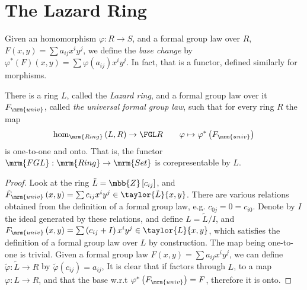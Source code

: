 \section{The Lazard Ring}

\begin{definition*}
	Given an homomorphism $\varphi: R \to S$,
	and a formal group law over $R$, $F\left(x,y\right) = \sum a_{ij} x^i y^j$,
	we define the \emph{base change} by
	$
		\varphi^*\left(F\right)\left(x,y\right)
		=
		\sum \varphi\left(a_{ij}\right) x^i y^j
	$.
	In fact, that is a functor, defined similarly for morphisms.
\end{definition*}

\begin{theorem*}
	There is a ring $L$, called the \emph{Lazard ring}, and a formal group law over it $F_\mrm{univ}$, called \emph{the universal formal group law},
	such that for every ring $R$ the map
	$$
		\hom_\mrm{Ring}\left(L,R\right)
		\to
		\FGL R
		\qquad
		\varphi \mapsto \varphi^*\left(F_\mrm{univ}\right)
	$$
	is one-to-one and onto.
	That is, the functor $\mrm{FGL}: \mrm{Ring} \to \mrm{Set}$ is corepresentable by $L$.
\end{theorem*}

\begin{proof}
	Look at the ring $\tilde{L} = \mbb{Z}\left[c_{ij}\right]$,
	and
	$
		\tilde{F}_\mrm{univ}\left(x,y\right)
		=
		\sum c_{ij} x^i y^j
		\in
		\taylor{\tilde{L}}{x,y}
	$.
	There are various relations obtained from the definition of a formal group law, e.g. $c_{0j} = 0 = c_{i0}$.
	Denote by $I$ the ideal generated by these relations, and define $L=\tilde{L}/I$,
	and
	$
		F_\mrm{univ}\left(x,y\right)
		=
		\sum \left(c_{ij} + I\right) x^i y^j
		\in
		\taylor{L}{x,y}
	$,
	which satisfies the definition of a formal group law over $L$ by construction.
	The map being one-to-one is trivial.
	Given a formal group law $F\left(x,y\right) = \sum a_{ij} x^i y^j$,
	we can define $\tilde{\varphi}: \tilde{L} \to R$ by $\tilde{\varphi}\left(c_{ij}\right) = a_{ij}$,
	It is clear that if factors through $L$, to a map $\varphi: L \to R$, and that the base w.r.t $\varphi^*\left(F_\mrm{univ}\right) = F$,
	therefore it is onto.
\end{proof}

